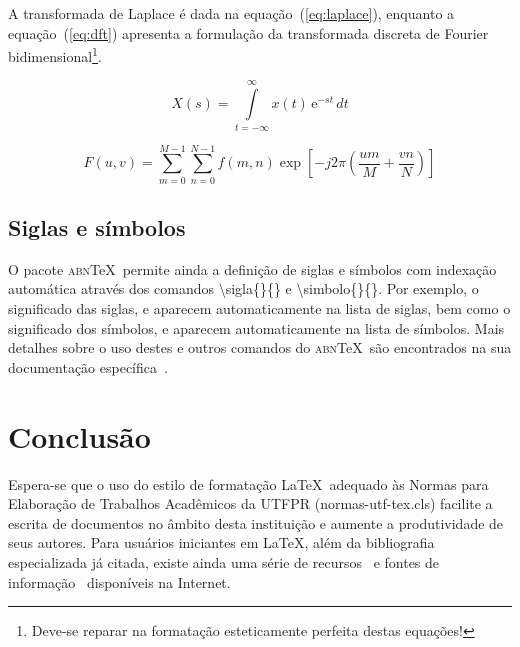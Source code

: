 \documentclass[openright]{normas-utf-tex} %
\begin{document}
A transformada de Laplace \'e dada na equa\c{c}\~ao~(\ref{eq:laplace}), enquanto a equa\c{c}\~ao~(\ref{eq:dft}) apresenta a formula\c{c}\~ao da transformada discreta de Fourier bidimensional\footnote{Deve-se reparar na formata\c{c}\~ao esteticamente perfeita destas equa\c{c}\~oes!}.

\begin{equation}
X(s) = \int\limits_{t = -\infty}^{\infty} x(t) \, \text{e}^{-st} \, dt
\label{eq:laplace}
\end{equation}

\begin{equation}
F(u, v) = \sum_{m = 0}^{M - 1} \sum_{n = 0}^{N - 1} f(m, n) \exp \left[ -j 2 \pi \left( \frac{u m}{M} + \frac{v n}{N} \right) \right]
\label{eq:dft}
\end{equation}

\section{Siglas e símbolos}

O pacote \textsc{abn}\TeX\ permite ainda a defini\c{c}\~ao de siglas e s\'imbolos com indexa\c{c}\~ao autom\'atica atrav\'es dos comandos {\ttfamily \textbackslash sigla\{\}\{\}} e {\ttfamily \textbackslash simbolo\{\}\{\}}. Por exemplo, o significado das siglas, e aparecem automaticamente na lista de siglas, bem como o significado dos s\'imbolos, e aparecem automaticamente na lista de s\'imbolos. Mais detalhes sobre o uso destes e outros comandos do \textsc{abn}\TeX\ s\~ao encontrados na sua documenta\c{c}\~ao espec\'ifica~\cite{abnTeX2009}.


\chapter{Conclusão}

Espera-se que o uso do estilo de formata\c{c}\~ao \LaTeX\ adequado \`as Normas para Elabora\c{c}\~ao de Trabalhos Acad\^emicos da UTFPR ({\ttfamily normas-utf-tex.cls}) facilite a escrita de documentos no \^ambito desta institui\c{c}\~ao e aumente a produtividade de seus autores. Para usu\'arios iniciantes em \LaTeX, al\'em da bibliografia especializada j\'a citada, existe ainda uma s\'erie de recursos~\cite{CTAN2009} e fontes de informa\c{c}\~ao~\cite{TeX-Br2009,Wikibooks2009} dispon\'iveis na Internet.
\end{document}
